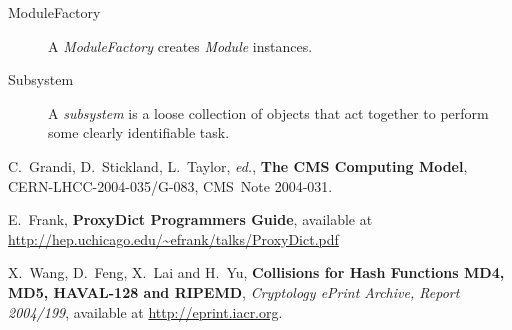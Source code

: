 \documentclass[draftmode]{memarticle}
\begin{document}
\begin{description}
\item[ModuleFactory]

A \emph{ModuleFactory} creates \emph{Module} instances.






\item[Subsystem]

A \emph{subsystem} is a loose collection of objects that
act together to perform some clearly identifiable task.

\end{description}

\begin{thebibliography}{99}

 C.~Grandi, D.~Stickland, L.~Taylor, \textit{ed.},
\textbf{The CMS Computing Model}, CERN-LHCC-2004-035/G-083, CMS~Note 2004-031.

 E.~Frank, \textbf{ProxyDict Programmers Guide},
available at \\
\url{http://hep.uchicago.edu/~efrank/talks/ProxyDict.pdf}

 X.~Wang, D.~Feng, X.~Lai and H.~Yu, %
\textbf{Collisions for Hash Functions MD4, MD5, HAVAL-128 and RIPEMD},%
\textit{Cryptology ePrint Archive, Report 2004/199}, %
available at {\url{http://eprint.iacr.org}}.

\end{thebibliography}

\end{document}
